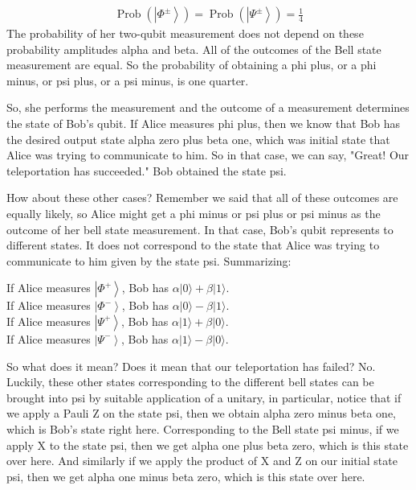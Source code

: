 \begin{align}
\operatorname{Prob}\left(\left|\Phi^{\pm}\right\rangle\right)=\operatorname{Prob}\left(\left|\Psi^{\pm}\right\rangle\right)=\frac{1}{4}
\end{align}
The probability of her two-qubit measurement does not depend on these probability amplitudes alpha and beta. All of the outcomes of the Bell state measurement are equal. So the probability of obtaining a phi plus, or a phi minus, or psi plus, or a psi minus, is one quarter.

So, she performs the measurement and the outcome of a measurement determines the state of Bob's qubit. If Alice measures phi plus, then we know that Bob has the desired output state alpha zero plus beta one, which was initial state that Alice was trying to communicate to him. So in that case, we can say, "Great! Our teleportation has succeeded." Bob obtained the state psi.

How about these other cases? Remember we said that all of these outcomes are equally likely, so Alice might get a phi minus or psi plus or psi minus as the outcome of her bell state measurement. In that case, Bob's qubit represents to different states. It does not correspond to the state that Alice was trying to communicate to him given by the state psi.  Summarizing:

\noindent
If Alice measures $\left|\Phi^{+}\right\rangle$, Bob has $\alpha|0\rangle+\beta|1\rangle$.\\
If Alice measures $\left|\Phi^{-}\right\rangle$, Bob has $\alpha|0\rangle-\beta|1\rangle$.\\
If Alice measures $\left|\Psi^{+}\right\rangle$, Bob has $\alpha|1\rangle+\beta|0\rangle$.\\
If Alice measures $\left|\Psi^{-}\right\rangle$, Bob has $\alpha|1\rangle-\beta|0\rangle$.

So what does it mean? Does it mean that our teleportation has failed? No. Luckily, these other states corresponding to the different bell states can be brought into psi by suitable application of a unitary, in particular, notice that if we apply a Pauli Z on the state psi, then we obtain alpha zero minus beta one, which is Bob's state right here. Corresponding to the Bell state psi minus, if we apply X to the state psi, then we get alpha one plus beta zero, which is this state over here. And similarly if we apply the product of X and Z on our initial state psi, then we get alpha one minus beta zero, which is this state over here. 

